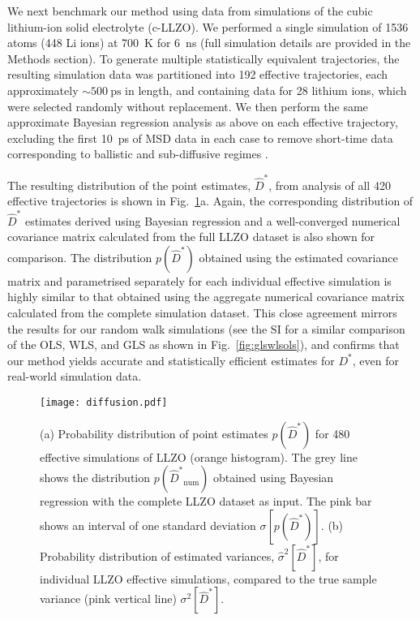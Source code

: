 \documentclass[reprint,superscriptaddress,nobibnotes,amsmath,amssymb,aps,prx,hidelinks,linenumbers]{revtex4-2}
\newcommand{\prob}[1]{\ensuremath{p(#1)}}
\newcommand{\Dest}{\ensuremath{\widehat{D}^*}}
\newcommand{\D}{\ensuremath{D^*}}
\newcommand{\var}[1]{\ensuremath{\sigma^2[#1]}}
\newcommand{\varest}[1]{\ensuremath{\widehat{\sigma}^2[#1]}}
\begin{document}
We next benchmark our method using data from simulations of the cubic lithium-ion solid electrolyte  (c-LLZO).
We performed a single simulation of \num{1536} atoms (\num{448} Li ions) at \SI{700}{K} for \SI{6}{\nano\second} (full simulation details are provided in the Methods section).
To generate multiple statistically equivalent trajectories, the resulting simulation data was partitioned into \num{192} effective trajectories, each approximately $\sim\SI{500}{\ps}$ in length, and containing data for \num{28} lithium ions, which were selected randomly without replacement.
We then perform the same approximate Bayesian regression analysis as above on each effective trajectory, excluding the first \SI{10}{ps} of MSD data in each case to remove short-time data corresponding to ballistic and sub-diffusive regimes \cite{he_statistical_2018}.

The resulting distribution of the point estimates, $\Dest$, from analysis of all \num{420} effective trajectories is shown in Fig.~\ref{fig:diffusion}a.
Again, the corresponding distribution of $\Dest$ estimates derived using Bayesian regression and a well-converged numerical covariance matrix calculated from the full LLZO dataset is also shown for comparison.
The distribution $\prob{\Dest}$ obtained using the estimated covariance matrix and parametrised separately for each individual effective simulation is highly similar to that obtained using the aggregate numerical covariance matrix calculated from the complete simulation dataset.
This close agreement mirrors the results for our random walk simulations (see the SI for a similar comparison of the OLS, WLS, and GLS as shown in Fig.~\ref{fig:glswlsols}), and confirms that our method yields accurate and statistically efficient estimates for $\D$, even for real-world simulation data.

\begin{figure}[tb]
    \centering
    \texttt{[image: diffusion.pdf]}
    \caption{
      (a) Probability distribution of point estimates $\prob{\Dest}$ for \num{480} effective simulations of LLZO (orange histogram).
      The grey line shows the distribution $\prob{\Dest_\mathrm{num}}$ obtained using Bayesian regression with the complete LLZO dataset as input.
      The pink bar shows an interval of one standard deviation $\sigma[\prob{\Dest}]$.
      (b) Probability distribution of estimated variances, $\varest{\Dest}$, for individual LLZO effective simulations, compared to the true sample variance (pink vertical line) $\var{\Dest}$.
    }
    \label{fig:diffusion}
\end{figure}
\end{document}
